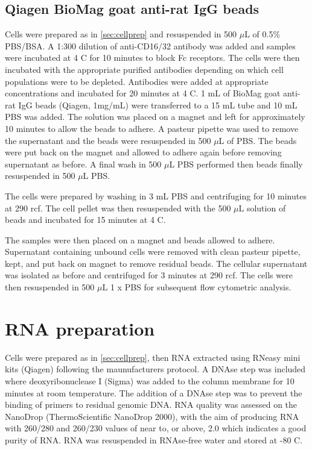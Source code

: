 \subsection{Qiagen BioMag goat anti-rat IgG beads}

Cells were prepared as in \cref{sec:cellprep} and resuspended in 500 $\mu$L of 0.5\% PBS/BSA.
A 1:300 dilution of anti-CD16/32 antibody was added and samples were incubated at 4 \textdegree C for 10 minutes to block Fc receptors.
The cells were then incubated with the appropriate purified antibodies depending on which cell populations were to be depleted.
Antibodies were added at appropriate concentrations and incubated for 20 minutes at 4 \textdegree C.
1 mL of BioMag goat anti-rat IgG beads (Qiagen, 1mg/mL) were transferred to a 15 mL tube and 10 mL PBS was added.
The solution was placed on a magnet and left for approximately 10 minutes to allow the beads to adhere.
A pasteur pipette was used to remove the supernatant and the beads were resuspended in 500 $\mu$L of PBS.
The beads were put back on the magnet and allowed to adhere again before removing supernatant as before.
A final wash in 500 $\mu$L PBS performed then beads finally resuspended in 500 $\mu$L PBS.

The cells were prepared by washing in 3 mL PBS and centrifuging for 10 minutes at 290 rcf.
The cell pellet was then resuspended with the 500 $\mu$L solution of beads and incubated for 15 minutes at 4 \textdegree C.

The samples were then placed on a magnet and beads allowed to adhere.
Supernatant containing unbound cells were removed with clean pasteur pipette, kept, and put back on magnet to remove residual beads.
The cellular supernatant was isolated as before and centrifuged for 3 minutes at 290 rcf.
The cells were then resuspended in 500 $\mu$L 1 x PBS for subsequent flow cytometric analysis.

\section{RNA preparation}

Cells were prepared as in \cref{sec:cellprep}, then RNA extracted using RNeasy mini kits (Qiagen) following the maunufacturers protocol.
A DNAse step was included where deoxyribonuclease I (Sigma) was added to the column membrane for 10 minutes at room temperature.
The addition of a DNAse step was to prevent the binding of primers to residual genomic DNA.
RNA quality was assessed on the NanoDrop (ThermoScientific NanoDrop 2000), with the aim of producing RNA with 260/280 and 260/230 values of near to, or above, 2.0 which indicates a good purity of RNA.
RNA was resuspended in RNAse-free water and stored at -80 \textdegree C.


